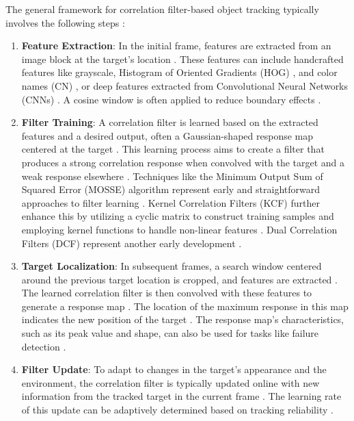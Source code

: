 The general framework for correlation filter-based object tracking typically involves the following steps \cite{du2021overview, zhao2020correlation}:
\begin{enumerate}
    \item \textbf{Feature Extraction}: In the initial frame, features are extracted from an image block at the target's location \cite{du2021overview, zhao2020correlation}. These features can include handcrafted features like grayscale, Histogram of Oriented Gradients (HOG) \cite{zhao2020correlation, du2021overview}, and color names (CN) \cite{lin2024motion}, or deep features extracted from Convolutional Neural Networks (CNNs) \cite{du2021overview, zhao2020correlation, lin2024motion}. A cosine window is often applied to reduce boundary effects \cite{du2021overview}.

    \item \textbf{Filter Training}: A correlation filter is learned based on the extracted features and a desired output, often a Gaussian-shaped response map centered at the target \cite{feng2019dynamic, du2021overview}. This learning process aims to create a filter that produces a strong correlation response when convolved with the target and a weak response elsewhere \cite{qiu2024boundary, du2021overview}. Techniques like the Minimum Output Sum of Squared Error (MOSSE) algorithm represent early and straightforward approaches to filter learning \cite{feng2019dynamic, du2021overview, zhao2020correlation}. Kernel Correlation Filters (KCF) further enhance this by utilizing a cyclic matrix to construct training samples and employing kernel functions to handle non-linear features \cite{du2021overview, zhao2020correlation, lin2024motion}. Dual Correlation Filters (DCF) represent another early development \cite{du2021overview}.

    \item \textbf{Target Localization}: In subsequent frames, a search window centered around the previous target location is cropped, and features are extracted \cite{zhao2020correlation}. The learned correlation filter is then convolved with these features to generate a response map \cite{du2021overview, zhao2020correlation}. The location of the maximum response in this map indicates the new position of the target \cite{du2021overview, zhao2020correlation}. The response map's characteristics, such as its peak value and shape, can also be used for tasks like failure detection \cite{lin2024motion}.

    \item \textbf{Filter Update}: To adapt to changes in the target's appearance and the environment, the correlation filter is typically updated online with new information from the tracked target in the current frame \cite{qiu2024boundary, du2021overview, zhao2020correlation}. The learning rate of this update can be adaptively determined based on tracking reliability \cite{du2021overview}.
\end{enumerate}

